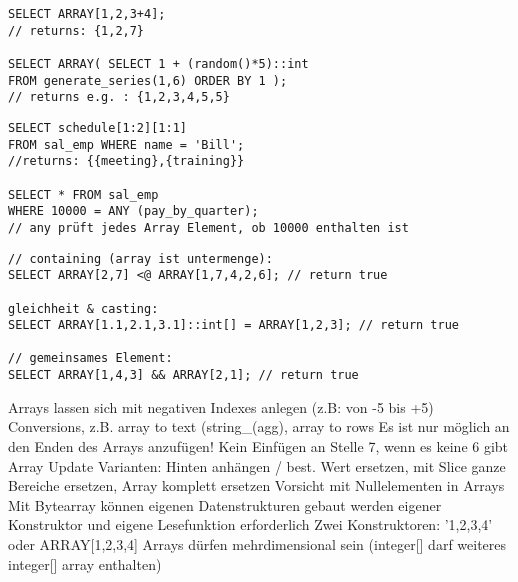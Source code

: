\documentclass[ngerman,a4paper,12pt]{scrreprt}
\begin{document}
\begin{verbatim}
SELECT ARRAY[1,2,3+4];
// returns: {1,2,7}

SELECT ARRAY( SELECT 1 + (random()*5)::int
FROM generate_series(1,6) ORDER BY 1 );
// returns e.g. : {1,2,3,4,5,5}
\end{verbatim}

\begin{verbatim}
SELECT schedule[1:2][1:1]
FROM sal_emp WHERE name = 'Bill';
//returns: {{meeting},{training}}

SELECT * FROM sal_emp
WHERE 10000 = ANY (pay_by_quarter);
// any prüft jedes Array Element, ob 10000 enthalten ist
\end{verbatim}

\begin{verbatim}
// containing (array ist untermenge):
SELECT ARRAY[2,7] <@ ARRAY[1,7,4,2,6]; // return true

gleichheit & casting: 
SELECT ARRAY[1.1,2.1,3.1]::int[] = ARRAY[1,2,3]; // return true

// gemeinsames Element:
SELECT ARRAY[1,4,3] && ARRAY[2,1]; // return true
\end{verbatim}


\ul
	\li Arrays lassen sich mit negativen Indexes anlegen (z.B: von -5 bis +5)
	\li Conversions, z.B. array to text (string\_(agg), array to rows
	\li Es ist nur möglich an den Enden des Arrays anzufügen! Kein Einfügen an Stelle 7, wenn es keine 6 gibt
	\li Array Update Varianten: Hinten anhängen / best. Wert ersetzen, mit Slice ganze Bereiche ersetzen, Array komplett ersetzen
	\li Vorsicht mit Nullelementen in Arrays
	\li Mit Bytearray können eigenen Datenstrukturen gebaut werden \ra eigener Konstruktor und eigene Lesefunktion erforderlich
	\li Zwei Konstruktoren: '{1,2,3,4}' oder ARRAY[1,2,3,4]
	\li Arrays dürfen mehrdimensional sein (integer[] darf weiteres integer[] array enthalten)
\ulE


\end{document}
